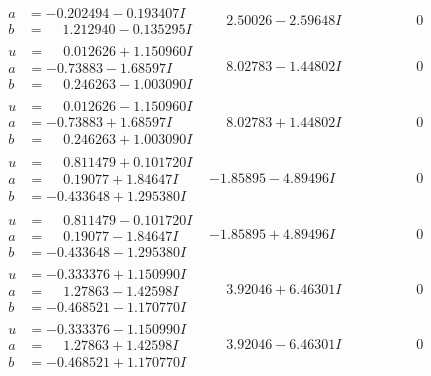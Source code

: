 \documentclass[1p]{elsarticle_modified}
\theoremstyle{definition}
\begin{document}
$$\begin{array}{c|c|c}
\begin{aligned}
a &= -0.202494 - 0.193407 I \\
b &= \phantom{-}1.212940 - 0.135295 I\end{aligned}
 & \phantom{-}2.50026 - 2.59648 I & \phantom{-0.000000 } 0 \\ \hline\begin{aligned}
u &= \phantom{-}0.012626 + 1.150960 I \\
a &= -0.73883 - 1.68597 I \\
b &= \phantom{-}0.246263 - 1.003090 I\end{aligned}
 & \phantom{-}8.02783 - 1.44802 I & \phantom{-0.000000 } 0 \\ \hline\begin{aligned}
u &= \phantom{-}0.012626 - 1.150960 I \\
a &= -0.73883 + 1.68597 I \\
b &= \phantom{-}0.246263 + 1.003090 I\end{aligned}
 & \phantom{-}8.02783 + 1.44802 I & \phantom{-0.000000 } 0 \\ \hline\begin{aligned}
u &= \phantom{-}0.811479 + 0.101720 I \\
a &= \phantom{-}0.19077 + 1.84647 I \\
b &= -0.433648 + 1.295380 I\end{aligned}
 & -1.85895 - 4.89496 I & \phantom{-0.000000 } 0 \\ \hline\begin{aligned}
u &= \phantom{-}0.811479 - 0.101720 I \\
a &= \phantom{-}0.19077 - 1.84647 I \\
b &= -0.433648 - 1.295380 I\end{aligned}
 & -1.85895 + 4.89496 I & \phantom{-0.000000 } 0 \\ \hline\begin{aligned}
u &= -0.333376 + 1.150990 I \\
a &= \phantom{-}1.27863 - 1.42598 I \\
b &= -0.468521 - 1.170770 I\end{aligned}
 & \phantom{-}3.92046 + 6.46301 I & \phantom{-0.000000 } 0 \\ \hline\begin{aligned}
u &= -0.333376 - 1.150990 I \\
a &= \phantom{-}1.27863 + 1.42598 I \\
b &= -0.468521 + 1.170770 I\end{aligned}
 & \phantom{-}3.92046 - 6.46301 I & \phantom{-0.000000 } 0\\

\end{array}$$
\end{document}
